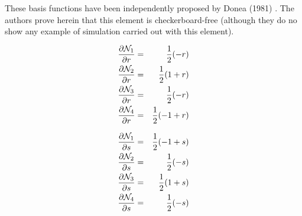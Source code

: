 \begin{remark}
These basis functions have been independently proposed by Donea \etal (1981) \cite{dogm81}. The authors
prove herein that this element is checkerboard-free (although they do no show any example
of simulation carried out with this element).
\end{remark}

\begin{eqnarray}
\frac{\partial {\mathcal{N}}_1}{\partial r} &=& \frac{1}{2}(-r)\\
\frac{\partial {\mathcal{N}}_2}{\partial r} &=& \frac{1}{2}(1+r)\\
\frac{\partial {\mathcal{N}}_3}{\partial r} &=& \frac{1}{2}(-r)\\
\frac{\partial {\mathcal{N}}_4}{\partial r} &=& \frac{1}{2}(-1+r)
\end{eqnarray}

\begin{eqnarray}
\frac{\partial {\mathcal{N}}_1}{\partial s} &=& \frac{1}{2}(-1+s)\\
\frac{\partial {\mathcal{N}}_2}{\partial s} &=& \frac{1}{2}(-s)\\
\frac{\partial {\mathcal{N}}_3}{\partial s} &=& \frac{1}{2}(1+s)\\
\frac{\partial {\mathcal{N}}_4}{\partial s} &=& \frac{1}{2}(-s)
\end{eqnarray}

